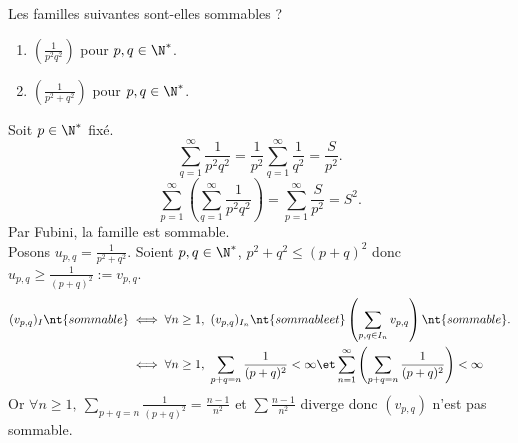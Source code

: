 \documentclass[11pt]{article}
\begin{document}
\begin{ex}{}{}
    Les familles suivantes sont-elles sommables ?
    \begin{enumerate}
        \item $\left(\frac{1}{p^2q^2}\right)$ pour $p,q\in\N^*$.
        \item $\left( \frac{1}{p^2+q^2} \right)$ pour $p,q\in\N^*$.
    \end{enumerate}
    \tcblower
     Soit $p\in\N^*$ fixé.
    \begin{equation*}
        \sum_{q=1}^\infty \frac{1}{p^2q^2} = \frac{1}{p^2}\sum_{q=1}^\infty\frac{1}{q^2} = \frac{S}{p^2}.
    \end{equation*}
    \begin{equation*}
        \sum_{p=1}^\infty\left( \sum_{q=1}^\infty\frac{1}{p^2q^2} \right) = \sum_{p=1}^\infty\frac{S}{p^2}=S^2.
    \end{equation*}
    Par Fubini, la famille est sommable.\\
     Posons $u_{p,q}=\frac{1}{p^2+q^2}$. Soient $p,q\in\N^*$, $p^2+q^2\leq(p+q)^2$ donc $u_{p,q}\geq\frac{1}{(p+q)^2}:=v_{p,q}$.
    \begin{align*}
        (v_{p,q})_I \nt{ sommable } &\iff \forall n \geq 1, ~ (v_{p,q})_{I_n} \nt{ sommable et } \left( \sum_{p,q\in I_n} v_{p,q} \right) \nt{ sommable}.\\
        &\iff \forall n \geq 1, ~ \sum_{p+q=n}\frac{1}{(p+q)^2}<\infty \et \sum_{n=1}^\infty\left( \sum_{p+q=n}\frac{1}{(p+q)^2} \right) < \infty
    \end{align*}
    Or $\forall n \geq 1, ~ \sum\limits_{p+q=n}\frac{1}{(p+q)^2}=\frac{n-1}{n^2}$ et $\sum\frac{n-1}{n^2}$ diverge donc $(v_{p,q})$ n'est pas sommable.
\end{ex}
\end{document}
